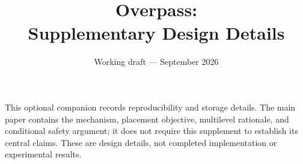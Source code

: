 \documentclass[11pt]{article}
\title{Overpass:\\Supplementary Design Details}
\author{}
\date{Working draft --- September 2026}
\begin{document}
\maketitle
\thispagestyle{plain}
This optional companion records reproducibility and storage details. The main
paper contains the mechanism, placement objective, multilevel rationale, and
conditional safety argument; it does not require this supplement to establish
its central claims. These are design details, not completed implementation or
experimental results.
\appendix


\end{document}

